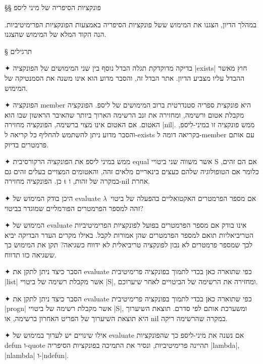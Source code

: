 §§ פונקציות הסיפריה של מיני ליספ

במהלך הדיון, הצגנו את המימוש ששל פונקציות הסיפריה באמצעות הפונקציות הפרימיטיביות.
הנה הקוד המלא של המימוש שהצגנו.
\immediate\closeout \libraryFile

\begin{LTR}
  
\end{LTR}

§ תרגילים
\begin{enumerate}
  ✦ בדיקה מדוקדקת תגלה הבדל נוסף בין שני המימושים של הפונקציה \E|exists| חוץ מאשר
  ההבדל עליו מצביע הדיון. אתר הבדל זה, והסבר מדוע הוא אינו משנה את הסמנטיקה של המימוש.

  ✦ הפונקציה member היא פונקצית ספריה סטנדרטית ברוב המימושים של ליספ. הפונקציה
  מקבלת אטום ורשימה, ומחזירה את זנב הרשימה הארוך ביותר שהאיבר הראשון שבו הוא
  האטום. אם האטום אינו מצוי ברשימה, הפונקציה מחזירה \E|nil|. ממש פונקציה זו
  במיני-ליספ, והסבר מדוע ניתן להשתמש להחליף כל קריאה ל-exists בקריאה דומה
  ל-member עם אותם פרמטרים בדיוק.

  ✦ ממש במיני ליספ את הפונקציה הרקורסיבית equal אשר משווה שני ביטויי S אם הם
  זהים, כלומר אם הטופולוגיה שלהם כעצים בינאריים מלאים זהה, והאטומים המצויים
  בעלים זהים גם כן. הפונקציה מחזירה t במקרה של זהות, ו-nil אחרת.

  ✦ היכן בודק המימוש של evaluate אם מספר הפרמטרים האקטואליים בהפעלה של
  ביטוי~$λ$ זהה למספר הפרמטרים הפורמליים שמוגדר בביטוי?

  ✦ המימוש של evaluate אינו בודק אם מספר הפרמטרים בפועל לפונקציות הפרימיטיביות
  הטריביאליות תואם למספר הפרמטרים שהן אמורות לקבל. באילו מקרים העדר הבדיקה יביא
  לכך שמספר פרמטרים לא נכון לפונקציה טריביאלית לא ידווח כשגיאה? תקן את המימוש
  כך ששגיאה כזו תדווח.

  ✦ הסבר כיצד ניתן לתקן את evaluate כפי שתוארה כאן בכדי לתמוך בפונקציה פרימיטיבית
  \E|list| אשר מקבלת רשימה של ביטויי \E|S|, ומחזירה את הרשימה של הביטויים לאחר
  שיערוכם.

  ✦ הסבר כיצד ניתן לתקן את evaluate כפי שתוארה כאן בכדי לתמוך בפונקציה פרימיטיבית
  \E|progn| אשר מקבלת רשימה של ביטויי \E|S|, ומשערכת אותם לפי סדרם. תוצאת השיערוך
  היא תוצאת השיערוך של הפריט האחרון ברשימה, או nil במקרה שהרשימה ריקה.

  ✦ אילו שינויים יש לערוך במימוש של evaluate אם נשנה את מיני-ליספ כך שהפונקציות
  defun ו-quote תהיינה פרימיטיביות, ונסיר את התמיכה בפונקציות הסיפריה \E|lambda|,
  \E|nlambda| ו-\E|ndefun|.


\end{enumerate}
